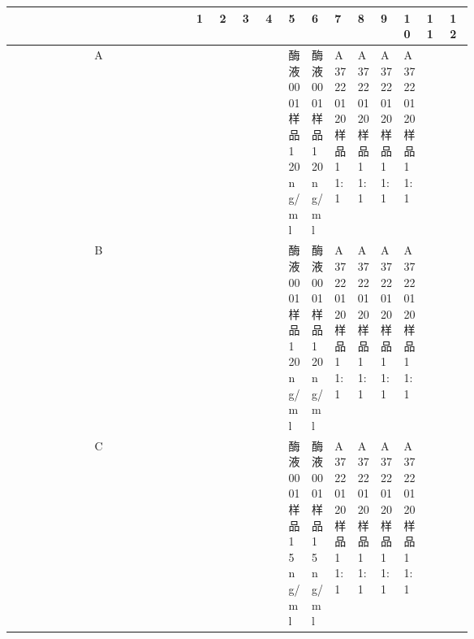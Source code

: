 \documentclass[UTF8,10pt,a4paper,fontset=fandol]{ctexart}
\begin{document}
\begin{center}
\scriptsize
\setlength{\tabcolsep}{2pt}
\begin{tabular}{c|*{12}{p{0.055\linewidth}|}}
 & 1 & 2 & 3 & 4 & 5 & 6 & 7 & 8 & 9 & 10 & 11 & 12\\ \hline
A & & & & &
\shortstack{酶液0001\\样品1\\20 ng/ml} &
\shortstack{酶液0001\\样品1\\20 ng/ml} &
\shortstack{A37220120\\样品1\\1:1} &
\shortstack{A37220120\\样品1\\1:1} &
\shortstack{A37220120\\样品1\\1:1} &
\shortstack{A37220120\\样品1\\1:1} & & \\ \hline
B & & & & &
\shortstack{酶液0001\\样品1\\20 ng/ml} &
\shortstack{酶液0001\\样品1\\20 ng/ml} &
\shortstack{A37220120\\样品1\\1:1} &
\shortstack{A37220120\\样品1\\1:1} &
\shortstack{A37220120\\样品1\\1:1} &
\shortstack{A37220120\\样品1\\1:1} & & \\ \hline
C & & & & &
\shortstack{酶液0001\\样品1\\5 ng/ml} &
\shortstack{酶液0001\\样品1\\5 ng/ml} &
\shortstack{A37220120\\样品1\\1:1} &
\shortstack{A37220120\\样品1\\1:1} &
\shortstack{A37220120\\样品1\\1:1} &
\shortstack{A37220120\\样品1\\1:1} & & \\ \hline

\end{tabular}
\end{center}
\end{document}
